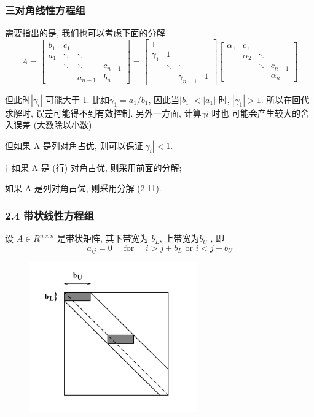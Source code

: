 \documentclass[notheorems,serif]{beamer}
\begin{document}
\begin{frame}
\frametitle{三对角线性方程组}
需要指出的是, 我们也可以考虑下面的分解
\begin{equation}
A=\left[\begin{array}{cccc}{b_{1}} & {c_{1}} & {} & {} \\ {a_{1}} & {\ddots} & {\ddots} & {} \\ {} & {\ddots} & {\ddots} & {c_{n-1}} \\ {} & {} & {a_{n-1}} & {b_{n}}\end{array}\right]=\left[\begin{array}{ccccc}{1} \\ {\gamma_{1}} & {1} & {} & {} \\ {} & {\ddots} & {\ddots} & {} \\ {} & {} & {\gamma_{n-1}} & {1}\end{array}\right]\left[\begin{array}{cccc}{\alpha_{1}} & {c_{1}} & {} & {} \\ {} & {\alpha_{2}} & {\ddots} & {} \\ {} & {} & {\ddots} & {c_{n-1}} \\ {} & {} & {} & {\alpha_{n}}\end{array}\right]
\end{equation}

但此时$ |\gamma_i|$ 可能大于 1. 比如$ \gamma_1 = a_1/b_1$, 因此当$|b_1| < |a_1|$ 时, $|\gamma_1| > 1$.
所以在回代求解时, 误差可能得不到有效控制. 另外一方面, 计算$ γi$ 时也
可能会产生较大的舍入误差 (大数除以小数).

但如果 A 是列对角占优, 则可以保证$ |\gamma_i| < 1.$


† 如果 A 是 (行) 对角占优, 则采用前面的分解;

如果 A 是列对角占优, 则采用分解 (2.11).
\end{frame}

\begin{frame}
\frametitle{2.4 \quad 带状线性方程组}
设 $A ∈ R^{n×n}$ 是带状矩阵, 其下带宽为 $b_L$, 上带宽为$b_U$ , 即
\begin{equation}
a_{i j}=0 \quad \text { for } \quad i>j+b_{L} \text { or } i<j-b_{U}
\end{equation}

\begin{figure}[h]%
	\centering  %
	\includegraphics[width=0.4\linewidth]{./figures/Figure_7.png}  %
	\caption{}  %
	\label{fig:mcmthesis-logo}   %
\end{figure}
\end{frame}
\end{document}

